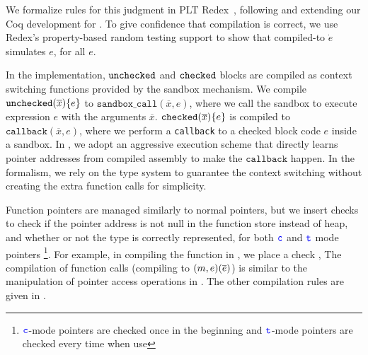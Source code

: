 We formalize rules for this judgment in PLT Redex~\cite{pltredex},
following and extending our Coq development for \lang. To give
confidence that compilation is correct, we use Redex's property-based
random testing support to show that compiled-to $\dot e $ simulates
$e$, for all $e$.

%
In the \systemname implementation,
$\mathtt{unchecked}$ and $\mathtt{checked}$ blocks 
are compiled as context switching functions provided by the sandbox mechanism.
We compile $\mathtt{unchecked}({\overline{x}})\{e\}$ to 
$\texttt{sandbox\_call}(\overline{x},e)$, where we call the sandbox 
to execute expression $e$ with the arguments $\overline{x}$.
$\mathtt{checked}({\overline{x}}){\{e\}}$ is compiled to 
$\texttt{callback}(\overline{x},e)$, where we perform 
a \texttt{callback} to a checked block code $e$ inside a sandbox.
In \systemname, we adopt an aggressive execution scheme that
directly learns pointer addresses from compiled assembly to make the $\texttt{callback}$ happen.
In the formalism, we rely on the type system to 
guarantee the context switching without creating the extra function calls for simplicity.


%
Function pointers are managed similarly to normal pointers,
but we insert checks to check if the pointer address is not null in 
the function store instead of heap, and whether or not the type is correctly represented, 
for both $\textcolor{blue}{\texttt{c}}$ and $\textcolor{blue}{\texttt{t}}$ mode pointers 
\footnote{$\textcolor{blue}{\texttt{c}}$-mode pointers are checked once in the beginning and $\textcolor{blue}{\texttt{t}}$-mode pointers are checked every time when use}.
For example, in compiling the  function in ,
we place a check ,
The compilation of function calls (compiling to ${(m,e)}({\overline{e}})$) 
is similar to the manipulation of pointer access operations in .
The other compilation rules are given in .
